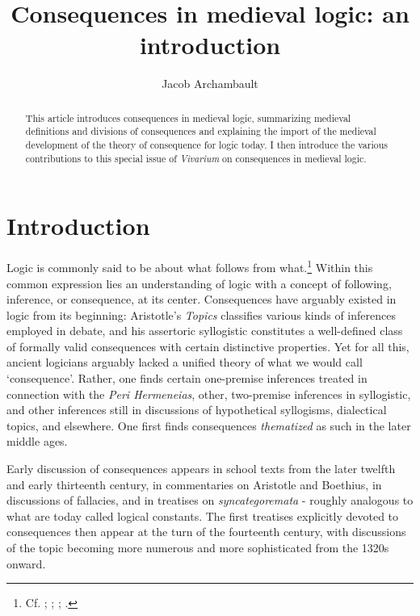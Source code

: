 \documentclass[]{article}
\title{Consequences in medieval logic: an introduction}
\author{Jacob Archambault}
\begin{document}
\maketitle

\begin{abstract}
This article introduces consequences in medieval logic, summarizing medieval definitions and divisions of consequences and explaining the import of the medieval development of the theory of consequence for logic today. I then introduce the various contributions to this special issue of \textit{Vivarium} on consequences in medieval logic.
\end{abstract}

\section{Introduction}
Logic is commonly said to be about what follows from what.\footnote{Cf. \autocite[156]{Kneale1948}; \autocite[74]{Etchemendy1988}; \autocite[99]{Read1995}; \autocite[3]{BeallRestall2006}.} Within this common expression lies an understanding of logic with a concept of following, inference, or consequence, at its center. Consequences have arguably existed in logic from its beginning: Aristotle's \textit{Topics} classifies various kinds of inferences employed in debate, and his assertoric syllogistic constitutes a well-defined class of formally valid consequences with certain distinctive properties. Yet for all this, ancient logicians arguably lacked a unified theory of what we would call `consequence'. Rather, one finds certain one-premise inferences treated in connection with the \textit{Peri Hermeneias}, other, two-premise inferences in syllogistic, and other inferences still in discussions of hypothetical syllogisms, dialectical topics, and elsewhere. One first finds consequences \textit{thematized} as such in the later middle ages. 

Early discussion of consequences appears in school texts from the later twelfth and early thirteenth century, in commentaries on Aristotle and Boethius, in discussions of fallacies, and in treatises on \textit{syncategoremata} - roughly analogous to what are today called logical constants. The first treatises explicitly devoted to consequences then appear at the turn of the fourteenth century, with discussions of the topic becoming more numerous and more sophisticated from the 1320s onward.
\end{document}
